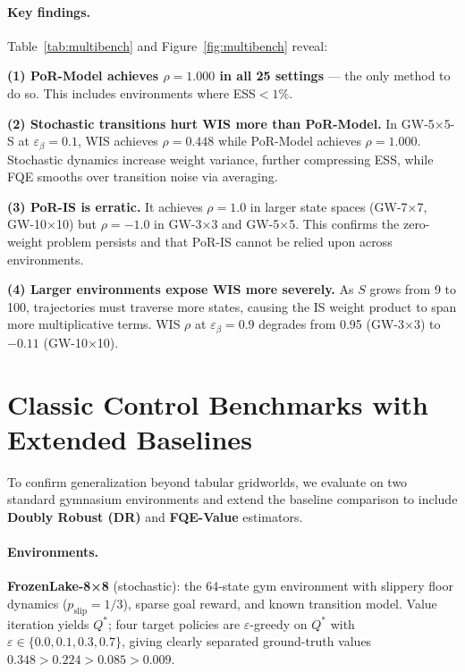 \documentclass[10pt]{article}
\theoremstyle{plain}
\theoremstyle{definition}
\theoremstyle{remark}
\begin{document}
\paragraph{Key findings.}
Table~\ref{tab:multibench} and Figure~\ref{fig:multibench} reveal:

\textbf{(1) PoR-Model achieves $\rho=1.000$ in all 25 settings} --- the only
method to do so.  This includes environments where ESS$<1\%$.

\textbf{(2) Stochastic transitions hurt WIS more than PoR-Model.}  In
GW-5×5-S at $\varepsilon_\beta=0.1$, WIS achieves $\rho=0.448$ while PoR-Model
achieves $\rho=1.000$.  Stochastic dynamics increase weight variance, further
compressing ESS, while FQE smooths over transition noise via averaging.

\textbf{(3) PoR-IS is erratic.}  It achieves $\rho=1.0$ in larger state
spaces (GW-7×7, GW-10×10) but $\rho=-1.0$ in GW-3×3 and GW-5×5.  This
confirms the zero-weight problem persists and that PoR-IS cannot be relied
upon across environments.

\textbf{(4) Larger environments expose WIS more severely.}  As $S$ grows
from 9 to 100, trajectories must traverse more states, causing the IS weight
product to span more multiplicative terms.  WIS $\rho$ at $\varepsilon_\beta=0.9$
degrades from 0.95 (GW-3×3) to $-0.11$ (GW-10×10).

\section{Classic Control Benchmarks with Extended Baselines}
\label{sec:classic}

To confirm generalization beyond tabular gridworlds, we evaluate on two
standard gymnasium environments and extend the baseline comparison to include
\textbf{Doubly Robust (DR)} and \textbf{FQE-Value} estimators.

\paragraph{Environments.}
\textbf{FrozenLake-8×8} (stochastic): the 64-state gym environment with
slippery floor dynamics ($p_\text{slip}=1/3$), sparse goal reward, and
known transition model.  Value iteration yields $Q^*$; four target policies
are $\varepsilon$-greedy on $Q^*$ with $\varepsilon\in\{0.0,0.1,0.3,0.7\}$,
giving clearly separated ground-truth values
$0.348 > 0.224 > 0.085 > 0.009$.
\end{document}
